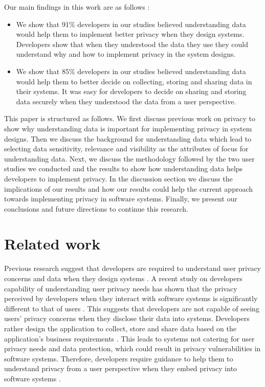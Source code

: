 \documentclass{sigchi}
\begin{document}
Our main findings in this work are as follows :

\begin{itemize}
\item We show that 91\% developers in our studies believed understanding data would help them to implement better privacy when they design systems. Developers show that when they understood the data they use they could understand why and how to implement privacy in the system designs.
\item We show that 85\% developers in our studies believed understanding data would help them to better decide on collecting, storing and sharing data in their systems. It was easy for developers to decide on sharing and storing data securely when they understood the data from a user perspective.
\end {itemize}

This paper is structured as follows. We first discuss previous work on privacy to show why understanding data is important for implementing privacy in system designs. Then we discuss the background for understanding data which lead to selecting data sensitivity, relevance and visibility as the attributes of focus for understanding data. Next, we discuss the methodology followed by the two user studies we conducted and the results to show how understanding data helps developers to implement privacy. In the discussion section we discuss the implications of our results and how our results could help the current approach towards implementing privacy in software systems. Finally, we present our conclusions and future directions to continue this research.

\section {Related work}

Previous research suggest that developers are required to understand user privacy concerns and data when they design systems  \cite{ramokapane2017feel, rao2016expecting, lin2012expectation, kalloniatis2008addressing, senarath2018understanding}. A recent study on developers capability of understanding user privacy needs has shown that the privacy perceived by developers when they interact with software systems is significantly different to that of users \cite {senarath2018understanding}. This suggests that developers are not capable of seeing users' privacy concerns when they disclose their data into systems. Developers rather design the application to collect, store and share data based on the application's business requirements \cite {senarath2018under, senarath2018understanding}. This leads to systems not catering for user privacy needs and data protection, which could result in privacy vulnerabilities in software systems. Therefore, developers require guidance to help them to understand privacy from a user perspective when they embed privacy into software systems \cite {senarath2018under}. 
\end{document}
